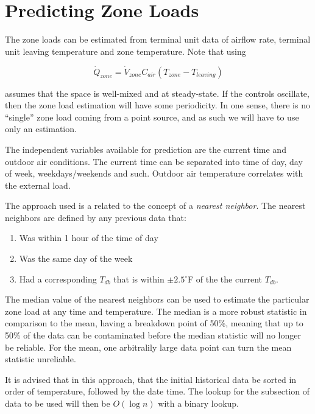 \section{Predicting Zone Loads}

The zone loads can be estimated from terminal unit data of airflow rate, terminal unit leaving temperature and zone temperature. Note that using 

\begin{equation}
\dot Q_{zone} = \dot V_{zone} C_{air} \left(T_{zone}-T_{leaving} \right)
\end{equation}

assumes that the space is well-mixed and at steady-state. If the controls oscillate, then the zone load estimation will have some periodicity. In one sense, there is no ``single'' zone load coming from a point source, and as such we will have to use only an estimation.

The independent variables available for prediction are the current time and outdoor air conditions. The current time can be separated into time of day, day of week, weekdays/weekends and such. Outdoor air temperature correlates with the external load. 

The approach used is a related to the concept of a \textit{nearest neighbor}. The nearest neighbors are defined by any previous data that:

\begin{enumerate}
\item Was within 1 hour of the time of day 
\item Was the same day of the week
\item Had a corresponding \(T_{db}\) that is within \(\pm 2.5^\circ\)F of the the current \(T_{db}\). 
\end{enumerate}

The median value of the nearest neighbors can be used to estimate the particular zone load at any time and temperature.  The median is a more robust statistic in comparison to the mean, having a breakdown point of 50\%, meaning that up to 50\% of the data can be contaminated before the median statistic will no longer be reliable. For the mean, one arbitralily large data point can turn the mean statistic unreliable. 

It is advised that in this approach, that the initial historical data be sorted in order of temperature, followed by the date time.  The lookup for the subsection of data to be used will then be \(O\left(\log n \right)\) with a binary lookup. 


